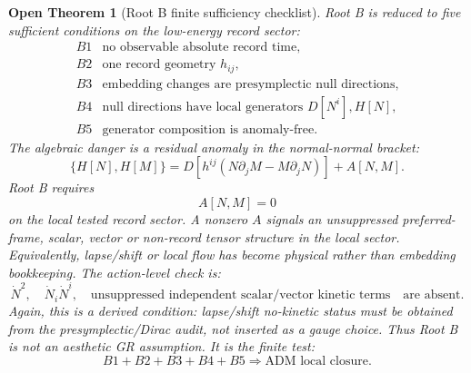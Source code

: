 \documentclass[11pt]{article}
\newtheorem{openthm}{Open Theorem}
\begin{document}
\begin{openthm}[Root B finite sufficiency checklist]
Root B is reduced to five sufficient conditions on the low-energy record
sector:
\[
\boxed{
\begin{array}{ll}
B1 & \text{no observable absolute record time},\\
B2 & \text{one record geometry }h_{ij},\\
B3 & \text{embedding changes are presymplectic null directions},\\
B4 & \text{null directions have local generators }D[N^i],H[N],\\
B5 & \text{generator composition is anomaly-free}.
\end{array}
}
\]
The algebraic danger is a residual anomaly in the normal-normal bracket:
\[
\boxed{
\{H[N],H[M]\}
=
D\!\left[h^{ij}(N\partial_jM-M\partial_jN)\right]
+A[N,M].
}
\]
Root B requires
\[
\boxed{
A[N,M]=0
}
\]
on the local tested record sector.  A nonzero \(A\) signals an unsuppressed
preferred-frame, scalar, vector or non-record tensor structure in the local
sector.
Equivalently, lapse/shift or local flow has become physical rather than
embedding bookkeeping.  The action-level check is:
\[
\boxed{
\dot N^2,\quad \dot N_i\dot N^i,\quad
\text{unsuppressed independent scalar/vector kinetic terms}
\quad\text{are absent}.
}
\]
Again, this is a derived condition: lapse/shift no-kinetic status must be
obtained from the presymplectic/Dirac audit, not inserted as a gauge choice.
Thus Root B is not an aesthetic GR assumption.  It is the finite test:
\[
\boxed{
B1+B2+B3+B4+B5
\Rightarrow
\text{ADM local closure}.
}
\]
\end{openthm}
\end{document}
